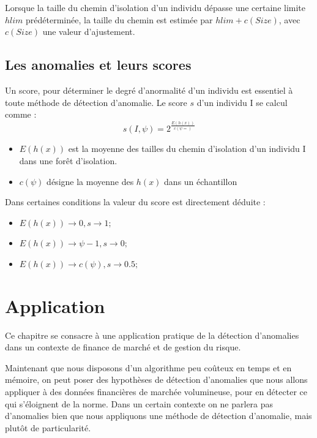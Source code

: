 Lorsque la taille du chemin d'isolation d'un individu dépasse une certaine limite $hlim$ prédéterminée, la taille du chemin est estimée par $hlim+c(Size)$, avec $c(Size)$ une valeur d'ajustement\cite{Liu2012}.

\section{Les anomalies et leurs scores}

Un score, pour déterminer le degré d'anormalité d'un individu est essentiel à toute méthode de détection d'anomalie.
Le score $s$ d'un individu I se calcul comme :
\begin{equation}
    s(I,\psi)=2^\frac{E(h(x))}{c(\psi=)}
\end{equation}

\begin{itemize}
    \item $E(h(x))$ est la moyenne des tailles du chemin d'isolation d'un individu I dans une forêt d'isolation.
    \item $c(\psi)$ désigne la moyenne des $h(x)$ dans un échantillon
\end{itemize}

Dans certaines conditions la valeur du score est directement déduite :
\begin{itemize}
    \item $E(h(x)) \rightarrow 0,  s \rightarrow 1;$
    \item $E(h(x)) \rightarrow \psi-1,  s \rightarrow 0; $
    \item $E(h(x)) \rightarrow c(\psi),  s \rightarrow 0.5;$
\end{itemize}

\chapter{Application}

Ce chapitre se consacre à une application pratique de la détection d'anomalies dans un contexte de finance de marché et de gestion du risque. 

Maintenant que nous disposons d'un algorithme peu coûteux en temps et en mémoire, on peut poser des hypothèses de détection d'anomalies que nous allons appliquer à des données financières de marchée volumineuse, pour en détecter ce qui s'éloignent de la norme. Dans un certain contexte on ne parlera pas d'anomalies bien que nous appliquons une méthode de détection d'anomalie, mais plutôt de particularité.

